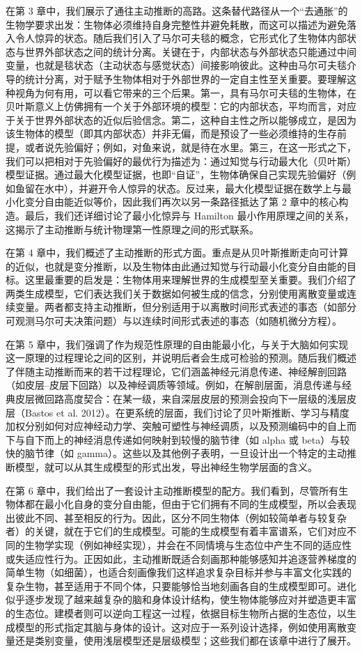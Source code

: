 在第 3 章中，我们展示了通往主动推断的高路。这条替代路径从一个“去通胀”的生物学要求出发：生物体必须维持自身完整性并避免耗散，而这可以描述为避免落入令人惊异的状态。随后我们引入了马尔可夫毯的概念，它形式化了生物体内部状态与世界外部状态之间的统计分离。关键在于，内部状态与外部状态只能通过中间变量，也就是毯状态（主动状态与感觉状态）间接影响彼此。这种由马尔可夫毯介导的统计分离，对于赋予生物体相对于外部世界的一定自主性至关重要。要理解这种视角为何有用，可以看它带来的三个后果。第一，具有马尔可夫毯的生物体，在贝叶斯意义上仿佛拥有一个关于外部环境的模型：它的内部状态，平均而言，对应于关于世界外部状态的近似后验信念。第二，这种自主性之所以能够成立，是因为该生物体的模型（即其内部状态）并非无偏，而是预设了一些必须维持的生存前提，或者说先验偏好；例如，对鱼来说，就是待在水里。第三，在这一形式之下，我们可以把相对于先验偏好的最优行为描述为：通过知觉与行动最大化（贝叶斯）模型证据。通过最大化模型证据，也即“自证”，生物体确保自己实现先验偏好（例如鱼留在水中），并避开令人惊异的状态。反过来，最大化模型证据在数学上与最小化变分自由能近似等价，因此我们再次以另一条路径抵达了第 2 章中的核心构造。最后，我们还详细讨论了最小化惊异与 Hamilton 最小作用原理之间的关系，这揭示了主动推断与统计物理第一性原理之间的形式联系。

在第 4 章中，我们概述了主动推断的形式方面。重点是从贝叶斯推断走向可计算的近似，也就是变分推断，以及生物体由此通过知觉与行动最小化变分自由能的目标。这里最重要的启发是：生物体用来理解世界的生成模型至关重要。我们介绍了两类生成模型，它们表达我们关于数据如何被生成的信念，分别使用离散变量或连续变量。两者都支持主动推断，但分别适用于以离散时间形式表述的事态（如部分可观测马尔可夫决策问题）与以连续时间形式表述的事态（如随机微分方程）。

在第 5 章中，我们强调了作为规范性原理的自由能最小化，与关于大脑如何实现这一原理的过程理论之间的区别，并说明后者会生成可检验的预测。随后我们概述了伴随主动推断而来的若干过程理论，它们涵盖神经元消息传递、神经解剖回路（如皮层--皮层下回路）以及神经调质等领域。例如，在解剖层面，消息传递与经典皮层微回路高度契合：在某一级，来自深层皮层的预测会投向下一层级的浅层皮层（Bastos et al. 2012）。在更系统的层面，我们讨论了贝叶斯推断、学习与精度加权分别如何对应神经动力学、突触可塑性与神经调质，以及预测编码中的自上而下与自下而上的神经消息传递如何映射到较慢的脑节律（如 alpha 或 beta）与较快的脑节律（如 gamma）。这些以及其他例子表明，一旦设计出一个特定的主动推断模型，就可以从其生成模型的形式出发，导出神经生物学层面的含义。

在第 6 章中，我们给出了一套设计主动推断模型的配方。我们看到，尽管所有生物体都在最小化自身的变分自由能，但由于它们拥有不同的生成模型，所以会表现出彼此不同、甚至相反的行为。因此，区分不同生物体（例如较简单者与较复杂者）的关键，就在于它们的生成模型。可能的生成模型有着丰富谱系，它们对应不同的生物学实现（例如神经实现），并会在不同情境与生态位中产生不同的适应性或失适应性行为。正因如此，主动推断既适合刻画那种能够感知并追逐营养梯度的简单生物（如细菌），也适合刻画像我们这样追求复杂目标并参与丰富文化实践的复杂生物，甚至适用于不同个体，只要能够恰当地刻画各自的生成模型即可。进化似乎逐步发现了越来越复杂的脑和身体设计结构，使生物体能够应对并塑造更丰富的生态位。建模者则可以逆向工程这一过程，依据目标生物所占据的生态位，以生成模型的形式指定其脑与身体的设计。这对应于一系列设计选择，例如使用离散变量还是类别变量，使用浅层模型还是层级模型；这些我们都在该章中进行了展开。

